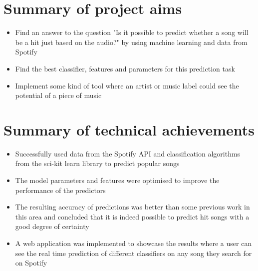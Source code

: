 \section{Summary of project aims}
\begin{itemize}
    \item Find an answer to the question "Is it possible to predict whether a song will be a hit just based on the audio?" by using machine learning and data from Spotify
    \item Find the best classifier, features and parameters for this prediction task
    \item Implement some kind of tool where an artist or music label could see the potential of a piece of music
\end{itemize}

\section{Summary of technical achievements}
\begin{itemize}
    \item Successfully used data from the Spotify API and classification algorithms from the sci-kit learn library to predict popular songs
    \item The model parameters and features were optimised to improve the performance of the predictors
    \item The resulting accuracy of predictions was better than some previous work in this area and concluded that it is indeed possible to predict hit songs with a good degree of certainty
    \item A web application was implemented to showcase the results where a user can see the real time prediction of different classifiers on any song they search for on Spotify
\end{itemize}



